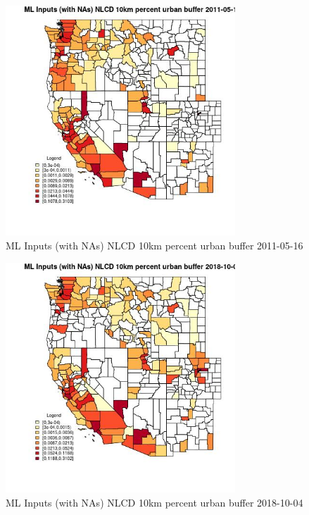 \begin{figure} 
\centering  
\includegraphics[width=0.77\textwidth]{Code_Outputs/Report_ML_input_PM25_Step4_part_f_de_duplicated_aveswNAs_CountyNLCD_10km_percent_urban_bufferMean2011-05-16.jpg} 
\caption{\label{fig:Report_ML_input_PM25_Step4_part_f_de_duplicated_aveswNAsCountyNLCD_10km_percent_urban_bufferMean2011-05-16}ML Inputs (with NAs) NLCD 10km percent urban buffer 2011-05-16} 
\end{figure} 
 

\begin{figure} 
\centering  
\includegraphics[width=0.77\textwidth]{Code_Outputs/Report_ML_input_PM25_Step4_part_f_de_duplicated_aveswNAs_CountyNLCD_10km_percent_urban_bufferMean2018-10-04.jpg} 
\caption{\label{fig:Report_ML_input_PM25_Step4_part_f_de_duplicated_aveswNAsCountyNLCD_10km_percent_urban_bufferMean2018-10-04}ML Inputs (with NAs) NLCD 10km percent urban buffer 2018-10-04} 
\end{figure} 
 

